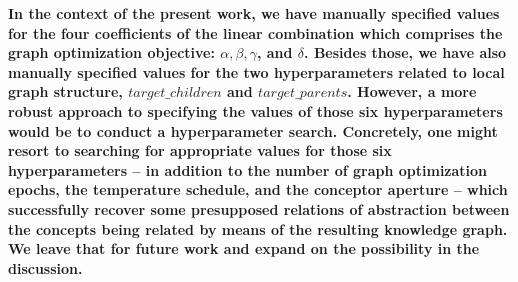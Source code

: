 \textbf{In the context of the present work, we have manually specified values for the four coefficients of the linear combination which comprises the graph optimization objective: $\alpha, \beta, \gamma$, and $\delta$. Besides those, we have also manually specified values for the two hyperparameters related to local graph structure, $target\_children$ and $target\_parents$. However, a more robust approach to specifying the values of those six hyperparameters would be to conduct a hyperparameter search. Concretely, one might resort to searching for appropriate values for those six hyperparameters -- in addition to the number of graph optimization epochs, the temperature schedule, and the conceptor aperture -- which successfully recover some presupposed relations of abstraction between the concepts being related by means of the resulting knowledge graph. We leave that for future work and expand on the possibility in the discussion.}